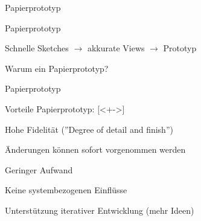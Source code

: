 

\begin{subsection}{Papierprototyp}

\begin{frame}{Papierprototyp}

Schnelle Sketches \pause $\rightarrow$ akkurate  Views \pause $\rightarrow$ Prototyp\\

\pause

\begin{question}[Frage]
Warum ein Papierprototyp?
\end{question}

\end{frame}


\begin{frame}{Papierprototyp}

\begin{titleditems}{Vorteile Papierprototyp: \cite{Arnowitz:2006:EPS:1196696}}[<+->] 
\pause
\item[\strong{+}]Hohe Fidelität (''Degree of detail and finish'')
\item[\strong{+}]Änderungen können sofort vorgenommen werden
\item[\strong{+}]Geringer Aufwand
\item[\strong{+}]Keine systembezogenen Einflüsse
\item[\strong{+}]Unterstützung iterativer Entwicklung (mehr Ideen)
\end{titleditems}


\end{frame}
\end{subsection} %




